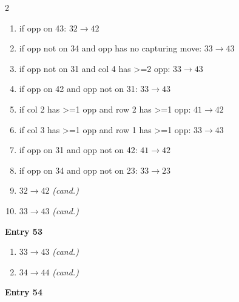 \begin{multicols}{2}
\begin{tikzpicture}[scale=0.24]
\end{tikzpicture}
\nopagebreak\begin{enumerate}[topsep=1pt,itemsep=0pt,parsep=0pt,leftmargin=2.2em,label=\arabic*.]
\item if opp on 43: $32\!\to\!42$
\item if opp not on 34 and opp has no capturing move: $33\!\to\!43$
\item if opp not on 31 and col 4 has >=2 opp: $33\!\to\!43$
\item if opp on 42 and opp not on 31: $33\!\to\!43$
\item if col 2 has >=1 opp and row 2 has >=1 opp: $41\!\to\!42$
\item if col 3 has >=1 opp and row 1 has >=1 opp: $33\!\to\!43$
\item if opp on 31 and opp not on 42: $41\!\to\!42$
\item if opp on 34 and opp not on 23: $33\!\to\!23$
\item $32\!\to\!42$ \hfill\textit{(cand.)}
\item $33\!\to\!43$ \hfill\textit{(cand.)}
\end{enumerate}\smallskip
\noindent\textbf{Entry 53} \; 
\nopagebreak\begin{enumerate}[topsep=1pt,itemsep=0pt,parsep=0pt,leftmargin=2.2em,label=\arabic*.]
\item $33\!\to\!43$ \hfill\textit{(cand.)}
\item $34\!\to\!44$ \hfill\textit{(cand.)}
\end{enumerate}\smallskip
\noindent\textbf{Entry 54} \; 
\end{multicols}
